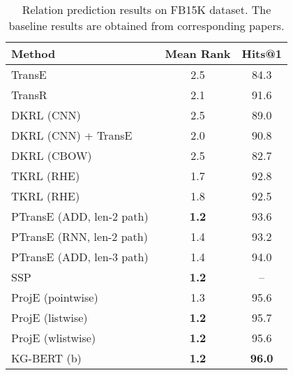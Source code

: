\documentclass[letterpaper]{article} \usepackage{aaai20}  \usepackage{times}  \usepackage{helvet} \usepackage{courier}  \usepackage[hyphens]{url}  \usepackage{graphicx} \urlstyle{rm} \def\UrlFont{\rm}  \usepackage{graphicx}  \usepackage{amsmath}
\begin{document}
    {\small
    \begin{table}[h]\scriptsize
    \centering
    \renewcommand{\arraystretch}{1.1}
    \begin{tabular}{l|cc}
    \hline
    \bf{Method}& Mean Rank & Hits@1 \\
    \hline
    TransE~\cite{lin2015modeling} & 2.5 & 84.3  \\ 
    TransR~\cite{xie2016representationijcai} &2.1 & 91.6\\
    DKRL (CNN)~\cite{xie2016representation}& 2.5  & 89.0    \\
    DKRL (CNN) + TransE~\cite{xie2016representation}& 2.0  & 90.8    \\
    DKRL (CBOW)~\cite{xie2016representation} & 2.5  & 82.7    \\
    TKRL (RHE)~\cite{xie2016representationijcai}  & 1.7  & 92.8    \\
    TKRL (RHE)~\cite{xie2016representationijcai}  & 1.8  & 92.5    \\
    PTransE (ADD, len-2 path)~\cite{lin2015modeling} & \textbf{1.2}& 93.6 \\
    PTransE (RNN, len-2 path)~\cite{lin2015modeling}  & 1.4  & 93.2 \\    
    PTransE (ADD, len-3 path)~\cite{lin2015modeling} &  1.4  &  94.0 \\
    SSP~\cite{xiao2017ssp} &\textbf{1.2}&--\\
    ProjE (pointwise)~\cite{shi2017proje} & 1.3 &  95.6   \\    
    ProjE (listwise)~\cite{shi2017proje} & \textbf{1.2} &  95.7   \\
    ProjE (wlistwise)~\cite{shi2017proje} & \textbf{1.2} &  95.6   \\   
    KG-BERT (b) & \textbf{1.2} & \textbf{96.0}  \\
    \hline
    \end{tabular}
    \caption{Relation prediction results on FB15K dataset. The baseline results are obtained from corresponding papers. }
    \label{tab:statistics}
    \end{table}
    }
\end{document}
